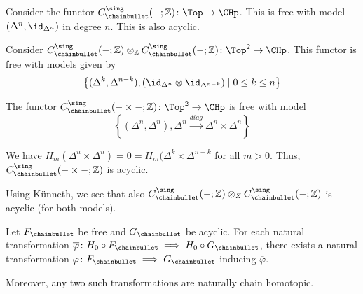 \begin{example}
  Consider the functor
  $C_\chainbullet ^{\sing}(\blank ; \mathbb{Z})\colon \Top \to \CHp$.
  This is free with model $(\Delta^n, \id_{\Delta^n})$ in degree $n$.
  This is also acyclic.
\end{example}

\begin{example}
  Consider
  $C_\chainbullet ^{\sing}(\blank ; \mathbb{Z}) \otimes _{\mathbb{Z}} C_\chainbullet ^{\sing}
  (\blank ; \mathbb{Z}) \colon  \Top^2 \to  \CHp$.
  This functor is free with models given by
  \[
    \left\{(\Delta^k, \Delta^{n-k}), (\id_{\Delta^n} \otimes \id_{\Delta^{n-k}}) 
    \mid  0 \leq  k \leq  n\right\} 
  \]

  The functor $C_{\chainbullet}^{\sing}(\blank \times  \blank ; \mathbb{Z}) \colon  \Top^2\to \CHp$
  is free with model
  \[
    \left\{(\Delta^n, \Delta^n), \Delta^n \xrightarrow{diag} \Delta^n \times \Delta^n \right\} 
  \]

  We have $H_m(\Delta^n \times \Delta^n) = 0 = H_m(\Delta^k \times \Delta^{n-k}$ 
  for all $m>0$.
  Thus,  $C_{\chainbullet}^{\sing}(- \times - ; \mathbb{Z})$ is acyclic.

  Using Künneth, we see that also
  $C_{\chainbullet}^{\sing}( \blank ; \mathbb{Z}) \otimes _Z C_{\chainbullet}^{\sing} (\blank ; \mathbb{Z})$ 
  is acyclic (for both models).
\end{example}

\begin{theorem}
  Let $F_{\chainbullet}$ be free and  $G_{\chainbullet}$ be acyclic.
  For each natural transformation
  $\overline{\varphi } \colon  H_0 \circ  F_{\chainbullet}
  \implies H_0 \circ  G_{\chainbullet}$,
  there exists a natural transformation $\varphi \colon F_{\chainbullet} \implies G_{\chainbullet}$
  inducing $\overline{\varphi }$.

  Moreover, any two such transformations are naturally chain homotopic.
\end{theorem}


